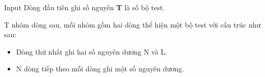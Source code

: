 Input  
Dòng đầu tiên ghi số nguyên   \textbf{    T   }   là số bộ test.  

   T nhóm dòng sau, mỗi nhóm gồm hai dòng thể hiện một bộ test với cấu trúc như sau:   
\begin{itemize}
	\item     Dòng thứ nhất ghi hai số nguyên dương N và L.   
	\item     N dòng tiếp theo mỗi dòng ghi một số nguyên dương.   
\end{itemize}
